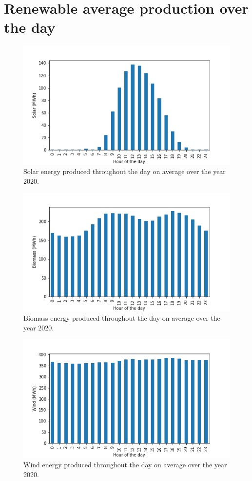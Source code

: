 \documentclass[11pt]{article} %
\begin{document}
\clearpage\newpage
\appendix

\section{Renewable average production over the day}\label{app:renewable}
\begin{figure}[h!]
  \includegraphics[width=0.8\linewidth]{../outputs/Solar.png}
  \caption{Solar energy produced throughout the day on average over the year 2020.}
  \label{fig:solar_kwh}
\end{figure}
\begin{figure}[h!]
  \includegraphics[width=0.8\linewidth]{../outputs/Biomass.png}
  \caption{Biomass energy produced throughout the day on average over the year 2020.}
  \label{fig:biomass_kwh}
\end{figure}
\begin{figure}[h!]
  \includegraphics[width=0.8\linewidth]{../outputs/Wind.png}
  \caption{Wind energy produced throughout the day on average over the year 2020.}
  \label{fig:wind_kwh}
\end{figure}
\end{document}
